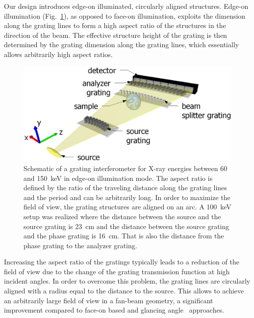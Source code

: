 Our design introduces edge-on illuminated,  circularly aligned structures.
Edge-on illumination (Fig.~\ref{Fig:schematic}), as
opposed to face-on illumination, exploits the dimension along the grating
lines to form a high aspect ratio of the structures in the direction of the beam. The
effective structure height of the grating is then determined by the grating
dimension along the grating lines, which essentially allows arbitrarily high
aspect ratios. 
\begin{figure}[h!]
    \centering
    \includegraphics[width=.7\textwidth]{gfx/figure1.eps}
    \caption{Schematic of a grating
        interferometer for X-ray energies between 60 and
        \SI{150}{\kilo\electronvolt} in edge-on illumination mode. The
        aspect ratio is defined by the ratio of the traveling distance along the
        grating lines and the period and can be arbitrarily long. In order to maximize
        the field of view, the grating structures are aligned on an
        arc. A \SI{100}{\kilo\eV} setup was realized where the distance
        between the source and the source grating is \SI{23}{\centi\metre}
    and the distance between the source grating and the phase grating is
    \SI{16}{\centi\metre}. That is also the distance from the phase grating
to the analyzer grating.}%
\label{Fig:schematic}
\end{figure}

Increasing the aspect ratio of the gratings typically leads to a reduction
of the field of view due to the change of the grating transmission function
at high incident angles. In order to overcome this problem, the grating
lines are circularly aligned with a radius equal to the distance to the
source. This allows to achieve an arbitrarily large field of view in a
fan-beam geometry, a significant improvement compared to face-on based and
glancing angle~\cite{Stutman2012a} approaches.

